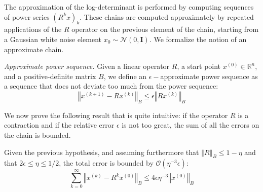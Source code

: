 The approximation of the log-determinant is performed by computing
sequences of power series $\left(R^{k}x\right)_{k}$. These chains
are computed approximately by repeated applications of the $R$ operator
on the previous element of the chain, starting from a Gaussian white
noise element $x_{0}\sim\mathcal{N}\left(0,\mathbf{I}\right)$. We
formalize the notion of an approximate chain. 

\begin{definition} \emph{Approximate power sequence. }Given a linear
operator $R$, a start point $x^{\left(0\right)}\in\mathbb{R}^{n}$,
and a positive-definite matrix $B$, we define an $\epsilon-$approximate
power sequence as a sequence that does not deviate too much from the
power sequence: 
\[
\left\Vert x^{\left(k+1\right)}-Rx^{\left(k\right)}\right\Vert _{B}\leq\epsilon\left\Vert Rx^{\left(k\right)}\right\Vert _{B}
\]


\end{definition}

We now prove the following result that is quite intuitive: if the
operator $R$ is a contraction and if the relative error $\epsilon$
is not too great, the sum of all the errors on the chain is bounded. 

\begin{lemma} Given the previous hypothesis, and assuming furthermore
that $\left\Vert R\right\Vert _{B}\leq1-\eta$ and that $2\epsilon\leq\eta\leq1/2$,
the total error is bounded by $\mathcal{O}\left(\eta^{-3}\epsilon\right)$:
\[
\sum_{k=0}^{\infty}\left\Vert x^{\left(k\right)}-R^{k}x^{\left(0\right)}\right\Vert _{B}\leq4\epsilon\eta^{-3}\left\Vert x^{\left(0\right)}\right\Vert _{B}
\]
\end{lemma}

